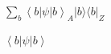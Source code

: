 \documentclass{article}
\begin{document}
$\sum_{b}\left\langle b\right|\psi\left|b\right\rangle_{A}|b\rangle\langle b|_{Z}$

$\left\langle b\right|\psi\left|b\right\rangle$
\end{document}
